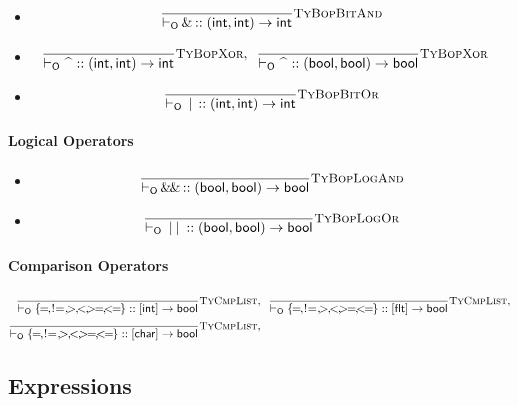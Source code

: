 \documentclass{article}
\newcommand{\code}[1]{\lstinline[columns=fixed]{#1}}
\newcommand{\drmrule}[5]{\frac{#1}{#2\vdash_{\mathsf{#3}}#4}\textsc{\small{#5}}}
\newcommand{\subsubsubsection}{\paragraph}
\begin{document}
					\begin{itemize}
						\item
							\begin{align*}
								\drmrule{}{}{O}{\textnormal{\code{\&}} :: \mathsf{(int,int) \to int}}{TyBopBitAnd}
							\end{align*}
						\item
							\begin{align*}
								\drmrule{}{}{O}{\textnormal{\code{^}} :: \mathsf{(int,int) \to int}}{TyBopXor},\ \ &
								\drmrule{}{}{O}{\textnormal{\code{^}} :: \mathsf{(bool,bool) \to bool}}{TyBopXor}
							\end{align*}
						\item
							\begin{align*}
								\drmrule{}{}{O}{\textnormal{\code{|}} :: \mathsf{(int,int) \to int}}{TyBopBitOr}
							\end{align*}
					\end{itemize}
				
				\subsubsubsection{Logical Operators}
				
					\begin{itemize}
						\item 
							\begin{align*}
								\drmrule{}{}{O}{\textnormal{\code{\&\&}} :: \mathsf{(bool,bool) \to bool}}{TyBopLogAnd}
							\end{align*}
						\item 
							\begin{align*}
								\drmrule{}{}{O}{\textnormal{\code{||}} :: \mathsf{(bool,bool) \to bool}}{TyBopLogOr}
							\end{align*}
					\end{itemize}
				
				\subsubsubsection{Comparison Operators}
				
					\begin{align*}
						\drmrule{}{}{O}{\{\textnormal{\code{=},\code{!=},\code{>},\code{<},\code{>=},\code{<=}}\} :: \mathsf{[int] \to bool}}{TyCmpList},\ \ &
						\drmrule{}{}{O}{\{\textnormal{\code{=},\code{!=},\code{>},\code{<},\code{>=},\code{<=}}\} :: \mathsf{[flt] \to bool}}{TyCmpList},\\
						\drmrule{}{}{O}{\{\textnormal{\code{=},\code{!=},\code{>},\code{<},\code{>=},\code{<=}}\} :: \mathsf{[char] \to bool}}{TyCmpList},\ \ &
					\end{align*}
					
					
		\subsection{Expressions}
		
\end{document}
